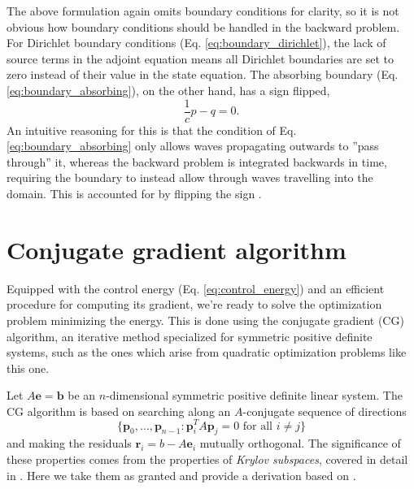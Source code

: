 \documentclass[utf8,english]{gradu3}
\begin{document}
The above formulation again omits boundary conditions for clarity,
so it is not obvious how boundary conditions should be handled in the backward problem.
For Dirichlet boundary conditions (Eq. \eqref{eq:boundary_dirichlet}),
the lack of source terms in the adjoint equation means
all Dirichlet boundaries are set to zero instead of their value in the state equation.
The absorbing boundary (Eq. \eqref{eq:boundary_absorbing}), on the other hand,
has a sign flipped,
\begin{equation}\label{eq:adjoint_boundary_absorbing}
  \frac{1}{c}p - q = 0.
\end{equation}
An intuitive reasoning for this is that the condition of Eq. \eqref{eq:boundary_absorbing}
only allows waves propagating outwards to ''pass through'' it,
whereas the backward problem is integrated backwards in time,
requiring the boundary to instead allow through waves travelling into the domain.
This is accounted for by flipping the sign \parencite{givoli_tutorial_2021}.


\section{Conjugate gradient algorithm}

Equipped with the control energy (Eq. \eqref{eq:control_energy})
and an efficient procedure for computing its gradient,
we're ready to solve the optimization problem minimizing the energy.
This is done using the conjugate gradient (CG) algorithm,
an iterative method specialized for symmetric positive definite systems,
such as the ones which arise from quadratic optimization problems like this one.

Let $A\mathbf{e} = \mathbf{b}$ be an $n$-dimensional symmetric positive definite linear system.
The CG algorithm is based on searching along an $A$-conjugate sequence of directions
\begin{equation}\label{eq:cg_search_directions}
  \{\mathbf{p}_0, \dots, \mathbf{p}_{n-1} : \mathbf{p}_i^T A \mathbf{p}_j = 0 \text{ for all } i \neq j\}
\end{equation}
and making the residuals $\mathbf{r}_i = b - A\mathbf{e}_i$ mutually orthogonal.
The significance of these properties comes from the properties of \textit{Krylov subspaces},
covered in detail in \textcite{saad_iterative_2003}.
Here we take them as granted and provide a derivation
based on \textcite[p. 199-200]{saad_iterative_2003}.
\end{document}

